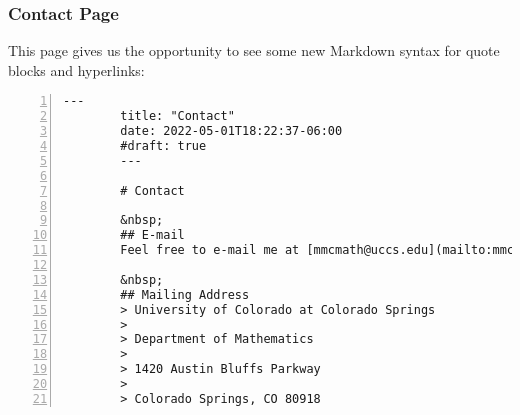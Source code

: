\begin{frame}[fragile]
    \frametitle{Contact Page}

    This page gives us the opportunity to see some new Markdown syntax for quote blocks and hyperlinks:
    
    \begin{lstlisting}[style=saneCode,gobble=8,title={content/contact.md},numbers=left]
        ---
        title: "Contact"
        date: 2022-05-01T18:22:37-06:00
        #draft: true
        ---
        
        # Contact
                
        &nbsp;
        ## E-mail
        Feel free to e-mail me at [mmcmath@uccs.edu](mailto:mmcmath@uccs.edu).
        
        &nbsp;
        ## Mailing Address
        > University of Colorado at Colorado Springs
        > 
        > Department of Mathematics 
        > 
        > 1420 Austin Bluffs Parkway
        > 
        > Colorado Springs, CO 80918 
    \end{lstlisting}
\end{frame}